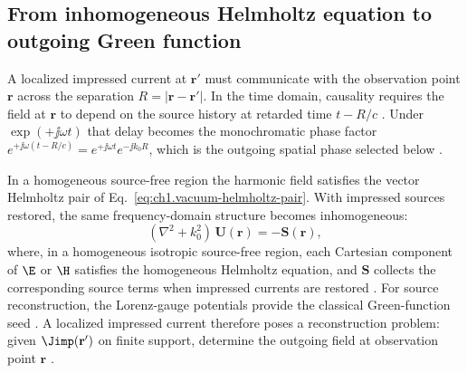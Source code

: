 \subsection{From inhomogeneous Helmholtz equation to outgoing Green function}
\label{sec:ch01.1.1c}

A localized impressed current at $\mathbf{r}'$ must communicate with the observation
point $\mathbf{r}$ across the separation $R=|\mathbf{r}-\mathbf{r}'|$. In the
time domain, causality requires the field at $\mathbf{r}$ to depend on the source
history at retarded time $t-R/c$ \cite{stratton1941,jackson1999}. Under
$\exp(+\jj\omega t)$ that delay becomes the monochromatic phase factor
$e^{+\jj\omega(t-R/c)}=e^{+\jj\omega t}e^{-\jj k_0 R}$, which is the outgoing
spatial phase selected below \cite{stratton1941}.

In a homogeneous source-free region the harmonic field satisfies the vector Helmholtz pair of Eq.~\eqref{eq:ch1.vacuum-helmholtz-pair}. With impressed sources restored, the same frequency-domain structure becomes inhomogeneous:
\begin{equation}
\label{eq:ch1.inhomogeneous-helmholtz}
(\nabla^2+k_0^2)\,\mathbf{U}(\mathbf{r})
=
-\mathbf{S}(\mathbf{r}),
\end{equation}
where, in a homogeneous isotropic source-free region, each Cartesian component of $\E$ or $\H$ satisfies the homogeneous Helmholtz equation, and $\mathbf{S}$ collects the corresponding source terms when impressed currents are restored \cite{stratton1941,jackson1999}. For source reconstruction, the Lorenz-gauge potentials provide the classical Green-function seed \cite{stratton1941}. A localized impressed current therefore poses a reconstruction problem: given $\Jimp(\mathbf{r}')$ on finite support, determine the outgoing field at observation point $\mathbf{r}$ \cite{maxwell1873,tai1994}.

